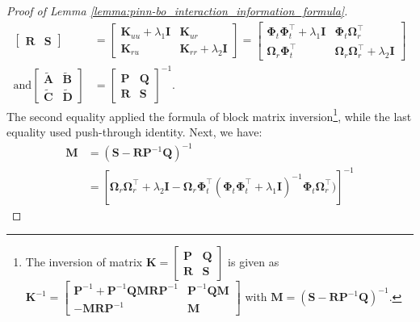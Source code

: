 \begin{proof}[Proof of Lemma \ref{lemma:pinn-bo_interaction_information_formula}]
\begin{align*}
\begin{bmatrix}
            \mathbf{R} & \mathbf{S}
            \end{bmatrix} & = \begin{bmatrix}
            \mathbf{K}_{uu} + \lambda_1\mathbf{I} & \mathbf{K}_{ur}  \\
            \mathbf{K}_{ru}  & \mathbf{K}_{rr} + \lambda_2\mathbf{I}
            \end{bmatrix} = \begin{bmatrix}
            \boldsymbol{\Phi}_t\boldsymbol{\Phi}_t^\top + \lambda_1\mathbf{I} & \boldsymbol{\Phi}_t \boldsymbol{\Omega}_r^\top \\
            \boldsymbol{\Omega}_r\boldsymbol{\Phi}_t^\top & \boldsymbol{\Omega}_r\boldsymbol{\Omega}_r^\top + \lambda_2 \mathbf{I}\end{bmatrix} \\
            \text{and} \begin{bmatrix}
    \widetilde{\mathbf{A}} & \widetilde{\mathbf{B}} 
\\
    \widetilde{\mathbf{C}} & \widetilde{\mathbf{D}} 
        \end{bmatrix} &=\begin{bmatrix}
            \mathbf{P} & \mathbf{Q} \\
            \mathbf{R} & \mathbf{S}
            \end{bmatrix} ^{-1}.
\end{align*}
The second equality applied the formula of block matrix inversion\footnote{The inversion of matrix $\mathbf{K} = \begin{bmatrix}
        \mathbf{P} & \mathbf{Q} \\ \mathbf{R} & \mathbf{S} 
    \end{bmatrix}$ is given as $\mathbf{K}^{-1} = \begin{bmatrix}
        \mathbf{P}^{-1} + \mathbf{P}^{-1} \mathbf{QMR}\mathbf{P}^{-1} & \mathbf{P}^{-1}\mathbf{QM} \\ -\mathbf{MR}\mathbf{P}^{-1} & \mathbf{M} 
    \end{bmatrix}$ with $\mathbf{M} = (\mathbf{S} - \mathbf{R}\mathbf{P}^{-1}\mathbf{Q})^{-1}$.}, 
    while the last equality used push-through identity. Next, we have:
\begin{align*}
            \mathbf{M} &= (\mathbf{S} - \mathbf{R}\mathbf{P}^{-1}\mathbf{Q})^{-1} 
\\
            &= \left[\boldsymbol{\Omega}_r \boldsymbol{\Omega}_r^\top  + \lambda_2\mathbf{I} - \boldsymbol{\Omega}_r \boldsymbol{\Phi}_t^\top (\boldsymbol{\Phi}_t \boldsymbol{\Phi}_t ^\top+ \lambda_1\mathbf{I})^{-1} \boldsymbol{\Phi}_t \boldsymbol{\Omega}_r^\top)\right]^{-1} 

\end{align*}
\end{proof}
